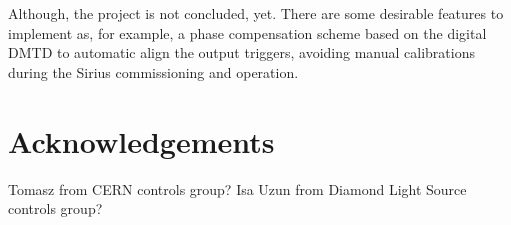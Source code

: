 \documentclass[a4paper,
               biblatex,      %
               ]{jacow}
\begin{document}
Although, the project is not concluded, yet. There are some desirable features to implement as, for example, a phase compensation scheme based on the digital DMTD to automatic align the output triggers, avoiding manual calibrations during the Sirius commissioning and operation. 

\section{Acknowledgements}
 Tomasz from CERN controls group?
 Isa Uzun from Diamond Light Source controls group?

\printbibliography
\newpage
\end{document}
